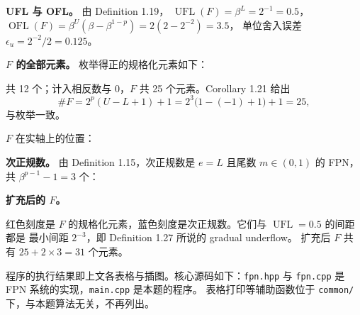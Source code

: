 \documentclass{article}
\newcommand{\UFL}{\operatorname{UFL}}
\newcommand{\OFL}{\operatorname{OFL}}
\begin{document}
\begin{solution}
  \textbf{UFL 与 OFL。} 由 Definition 1.19，
  $\UFL(F) = \beta^{L} = 2^{-1} = 0.5$，
  $\OFL(F) = \beta^{U}(\beta - \beta^{1-p}) = 2(2 - 2^{-2}) = 3.5$，
  单位舍入误差 $\epsilon_u = 2^{-2}/2 = 0.125$。

  \textbf{$F$ 的全部元素。} 枚举得正的规格化元素如下：
  \begin{center}
    
  \end{center}
  共 12 个；计入相反数与 0，$F$ 共 25 个元素。Corollary 1.21 给出
  \[
    \#F = 2^{p}(U - L + 1) + 1 = 2^{3}\bigl(1 - (-1) + 1\bigr) + 1 = 25,
  \]
  与枚举一致。

  $F$ 在实轴上的位置：
  \begin{center}
    
  \end{center}

  \textbf{次正规数。} 由 Definition 1.15，次正规数是 $e = L$ 且尾数 $m \in (0,1)$
  的 FPN，共 $\beta^{p-1} - 1 = 3$ 个：
  \begin{center}
    
  \end{center}

  \textbf{扩充后的 $F$。}
  \begin{center}
    
  \end{center}
  红色刻度是 $F$ 的规格化元素，蓝色刻度是次正规数。它们与 $\UFL = 0.5$ 的间距都是
  最小间距 $2^{-3}$，即 Definition 1.27 所说的 gradual underflow。
  扩充后 $F$ 共有 $25 + 2 \times 3 = 31$ 个元素。
\end{solution}

程序的执行结果即上文各表格与插图。核心源码如下：\texttt{fpn.hpp} 与
\texttt{fpn.cpp} 是 FPN 系统的实现，\texttt{main.cpp} 是本题的程序。
表格打印等辅助函数位于 \texttt{common/} 下，与本题算法无关，不再列出。




\end{document}
